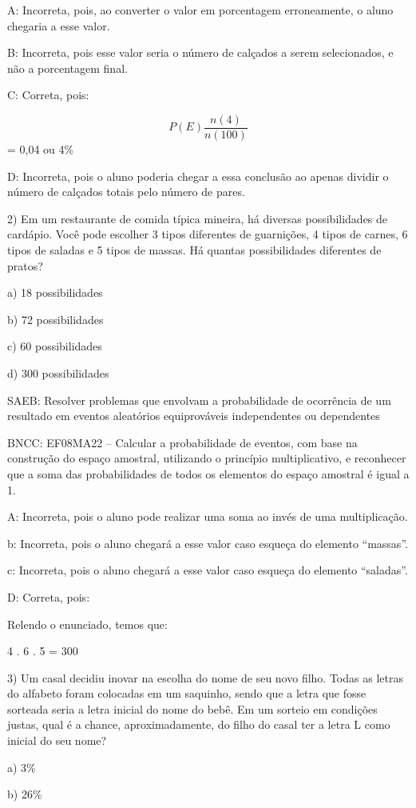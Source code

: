 A: Incorreta, pois, ao converter o valor em porcentagem erroneamente, o
aluno chegaria a esse valor.

B: Incorreta, pois esse valor seria o número de calçados a serem
selecionados, e não a porcentagem final.

C: Correta, pois:

\[P(E)\frac{n(4)}{n(100)}\] = 0,04 ou 4\%

D: Incorreta, pois o aluno poderia chegar a essa conclusão ao apenas
dividir o número de calçados totais pelo número de pares.

2) Em um restaurante de comida típica mineira, há diversas
possibilidades de cardápio. Você pode escolher 3 tipos diferentes de
guarnições, 4 tipos de carnes, 6 tipos de saladas e 5 tipos de massas.
Há quantas possibilidades diferentes de pratos?

a) 18 possibilidades

b) 72 possibilidades

c) 60 possibilidades

d) 300 possibilidades

SAEB: Resolver problemas que envolvam a probabilidade de ocorrência de
um resultado em eventos aleatórios equiprováveis independentes ou
dependentes

BNCC: EF08MA22 -- Calcular a probabilidade de eventos, com base na
construção do espaço amostral, utilizando o princípio multiplicativo, e
reconhecer que a soma das probabilidades de todos os elementos do espaço
amostral é igual a 1.

A: Incorreta, pois o aluno pode realizar uma soma ao invés de uma
multiplicação.

b: Incorreta, pois o aluno chegará a esse valor caso esqueça do elemento
``massas''.

c: Incorreta, pois o aluno chegará a esse valor caso esqueça do elemento
``saladas''.

D: Correta, pois:

Relendo o enunciado, temos que:

4 . 6 . 5 = 300

3) Um casal decidiu inovar na escolha do nome de seu novo filho. Todas
as letras do alfabeto foram colocadas em um saquinho, sendo que a letra
que fosse sorteada seria a letra inicial do nome do bebê. Em um sorteio
em condições justas, qual é a chance, aproximadamente, do filho do casal
ter a letra L como inicial do seu nome?

a) 3\%

b) 26\%

